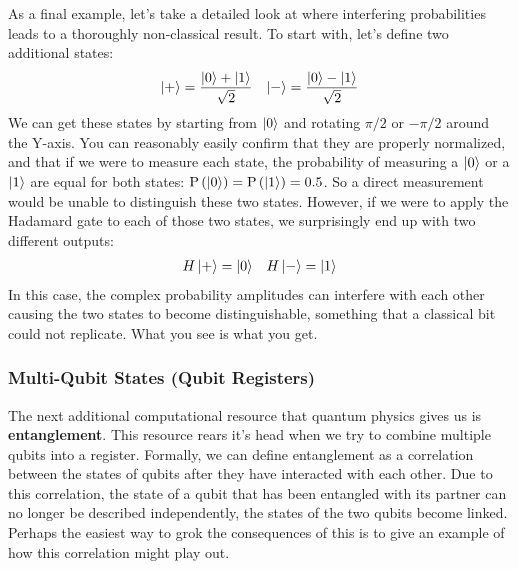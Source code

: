 As a final example, let's take a detailed look at where interfering probabilities leads to a thoroughly
non-classical result. To start with, let's define two additional states:
\begin{align}
  \ket{+} = \frac{\ket{0} + \ket{1}}{\sqrt{2}} && \ket{-} = \frac{\ket{0} - \ket{1}}{\sqrt{2}}
\end{align}
We can get these states by starting from $\ket{0}$ and rotating $\pi/2$ or $-\pi/2$ around the Y-axis. You can
reasonably easily confirm that they are properly normalized, and that if we were to measure each state, the
probability of measuring a $\ket{0}$ or a $\ket{1}$ are equal for both states: $\mathrm{P}\left(\ket{0}\right) =
\mathrm{P}\left(\ket{1}\right) = 0.5$. So a direct measurement would be unable to distinguish these two states.
However, if we were to apply the Hadamard gate to each of those two states, we surprisingly end up with two
different outputs:
\begin{align}
  H\ket{+} = \ket{0} && H\ket{-} = \ket{1}
\end{align}
In this case, the complex probability amplitudes can interfere with each other causing the two states to
become distinguishable, something that a classical bit could not replicate. What you see is what you get.

\subsubsection{Multi-Qubit States (Qubit Registers)}
The next additional computational resource that quantum physics gives us is \textbf{entanglement}. This
resource rears it's head when we try to combine multiple qubits into a register. Formally,
we can define entanglement as a correlation between the states of qubits after they have interacted
with each other. Due to this correlation, the state of a qubit that has been entangled with its partner
can no longer be described independently, the states of the two qubits become linked. Perhaps the easiest
way to grok the consequences of this is to give an example of how this correlation might play out.

